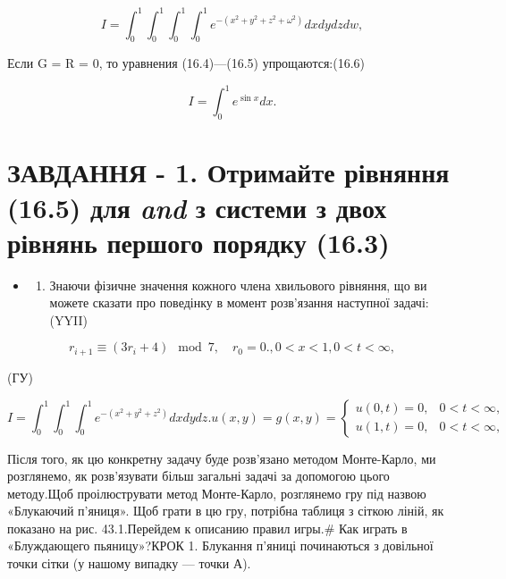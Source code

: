 \documentclass[
  ukrainian,
]{article}
\providecommand{\tightlist}{%
  \setlength{\itemsep}{0pt}\setlength{\parskip}{0pt}}
\begin{document}
\[
I = \int_{0}^{1} \int_{0}^{1} \int_{0}^{1} \int_{0}^{1} e^{-(x^{2}+y^{2}+z^{2}+\omega^{2})} dx dy dz dw,
\]

Если G = R = 0, то уравнения (16.4)---(16.5) упрощаются:(16.6)

\[
I = \int_{0}^{1} e^{\sin x} dx.
\]

\section{\texorpdfstring{ЗАВДАННЯ - 1. Отримайте рівняння (16.5) для
\emph{and} з системи з двох рівнянь першого порядку
(16.3)}{ЗАВДАННЯ - 1. Отримайте рівняння (16.5) для and з системи з двох рівнянь першого порядку (16.3)}}\label{ux437ux430ux432ux434ux430ux43dux43dux44f---1.-ux43eux442ux440ux438ux43cux430ux439ux442ux435-ux440ux456ux432ux43dux44fux43dux43dux44f-16.5-ux434ux43bux44f-and-ux437-ux441ux438ux441ux442ux435ux43cux438-ux437-ux434ux432ux43eux445-ux440ux456ux432ux43dux44fux43dux44c-ux43fux435ux440ux448ux43eux433ux43e-ux43fux43eux440ux44fux434ux43aux443-16.3}

\begin{itemize}
\tightlist
\item
  \begin{enumerate}
  \def\labelenumi{\arabic{enumi}.}
  \setcounter{enumi}{1}
  \tightlist
  \item
    Знаючи фізичне значення кожного члена хвильового рівняння, що ви
    можете сказати про поведінку в момент розв'язання наступної
    задачі:(YYII)
  \end{enumerate}
\end{itemize}

\[
r_{i+1} \equiv (3r_i + 4) \mod 7, \quad r_0 = 0.
,  0 < x < 1  ,  0 < t < \infty  ,
\]

(ГУ)

\[
I = \int_{0}^{1} \int_{0}^{1} \int_{0}^{1} e^{-(x^{2}+y^{2}+z^{2})} dx dy dz.
u(x,y) = g(x,y) =
\begin{cases} u(0, t) = 0, & 0 < t < \infty, \\ u(1, t) = 0, & 0 < t < \infty, \end{cases}
\]

Після того, як цю конкретну задачу буде розв'язано методом Монте-Карло,
ми розглянемо, як розв'язувати більш загальні задачі за допомогою цього
методу.Щоб проілюструвати метод Монте-Карло, розглянемо гру під назвою
«Блукаючий п'яниця». Щоб грати в цю гру, потрібна таблиця з сіткою
ліній, як показано на рис. 43.1.Перейдем к описанию правил игры.\# Как
играть в «Блуждающего пьяницу»?КРОК 1. Блукання п'яниці починаються з
довільної точки сітки (у нашому випадку --- точки А).
\end{document}
